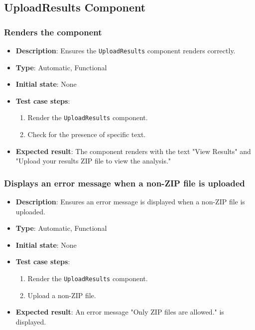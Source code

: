 \documentclass[12pt, titlepage]{article}
\begin{document}
\subsection{UploadResults Component}

\subsubsection{Renders the component}
\begin{itemize}
    \item \textbf{Description}: Ensures the \texttt{UploadResults} component renders correctly.
    \item \textbf{Type}: Automatic, Functional
    \item \textbf{Initial state}: None
    \item \textbf{Test case steps}:
    \begin{enumerate}
        \item Render the \texttt{UploadResults} component.
        \item Check for the presence of specific text.
    \end{enumerate}
    \item \textbf{Expected result}: The component renders with the text "View Results" and "Upload your results ZIP file to view the analysis."
\end{itemize}

\subsubsection{Displays an error message when a non-ZIP file is uploaded}
\begin{itemize}
    \item \textbf{Description}: Ensures an error message is displayed when a non-ZIP file is uploaded.
    \item \textbf{Type}: Automatic, Functional
    \item \textbf{Initial state}: None
    \item \textbf{Test case steps}:
    \begin{enumerate}
        \item Render the \texttt{UploadResults} component.
        \item Upload a non-ZIP file.
    \end{enumerate}
    \item \textbf{Expected result}: An error message "Only ZIP files are allowed." is displayed.
\end{itemize}
\end{document}
